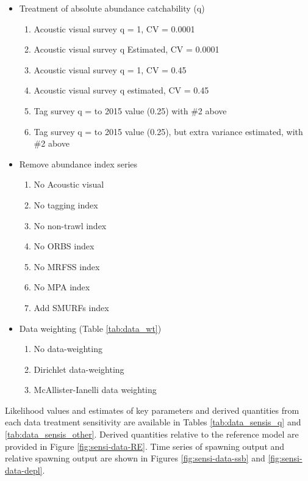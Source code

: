\documentclass[11pt,
  english,
  letterpaper,
]{article}
\providecommand{\tightlist}{%
  \setlength{\itemsep}{0pt}\setlength{\parskip}{0pt}}
\providecommand{\tightlist}{%
  \setlength{\itemsep}{0pt}\setlength{\parskip}{0pt}}
\begin{document}
\begin{itemize}
\tightlist
\item
  Treatment of absolute abundance catchability (q)

  \begin{enumerate}
  \def\labelenumi{\arabic{enumi}.}
  \tightlist
  \item
    Acoustic visual survey q = 1, CV = 0.0001
  \item
    Acoustic visual survey q Estimated, CV = 0.0001
  \item
    Acoustic visual survey q = 1, CV = 0.45
  \item
    Acoustic visual survey q estimated, CV = 0.45
  \item
    Tag survey q = to 2015 value (0.25) with \#2 above
  \item
    Tag survey q = to 2015 value (0.25), but extra variance estimated, with \#2 above
  \end{enumerate}
\item
  Remove abundance index series

  \begin{enumerate}
  \def\labelenumi{\arabic{enumi}.}
  \setcounter{enumi}{6}
  \tightlist
  \item
    No Acoustic visual
  \item
    No tagging index
  \item
    No non-trawl index
  \item
    No ORBS index
  \item
    No MRFSS index
  \item
    No MPA index
  \item
    Add SMURFs index
  \end{enumerate}
\item
  Data weighting (Table \ref{tab:data_wt})

  \begin{enumerate}
  \def\labelenumi{\arabic{enumi}.}
  \setcounter{enumi}{13}
  \tightlist
  \item
    No data-weighting
  \item
    Dirichlet data-weighting
  \item
    McAllister-Ianelli data weighting
  \end{enumerate}
\end{itemize}

Likelihood values and estimates of key parameters and derived quantities from each data treatment sensitivity are available in Tables \ref{tab:data_sensis_q} and \ref{tab:data_sensis_other}. Derived quantities relative to the reference model are provided in Figure \ref{fig:sensi-data-RE}. Time series of spawning output and relative spawning output are shown in Figures \ref{fig:sensi-data-ssb} and \ref{fig:sensi-data-depl}.
\end{document}
